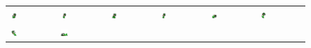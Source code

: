\documentclass[book.tex]{subfiles}
\begin{document}
\begin{figure}[H]
\centering
 \begin{table}[H]
  \begin{tabularx}{\textwidth}[c]{|XXXXXX|}
  \hline
  \includegraphics[width=0.18\textwidth]{screenshots_300dpi/game/sprite1a.png} &
  \includegraphics[width=0.18\textwidth]{screenshots_300dpi/game/sprite1b.png} &
  \includegraphics[width=0.18\textwidth]{screenshots_300dpi/game/sprite1c.png} &
  \includegraphics[width=0.18\textwidth]{screenshots_300dpi/game/sprite1d.png} &
  \includegraphics[width=0.18\textwidth]{screenshots_300dpi/game/sprite1e.png} &
  \includegraphics[width=0.18\textwidth]{screenshots_300dpi/game/sprite1f.png} \\  
  \includegraphics[width=0.18\textwidth]{screenshots_300dpi/game/sprite1g.png} & 
  \includegraphics[width=0.18\textwidth]{screenshots_300dpi/game/sprite1h.png} &

\end{tabularx}
\end{table}
\end{figure}
\end{document}
